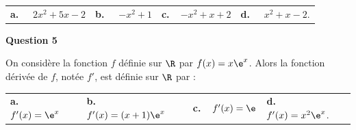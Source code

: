 \begin{tabularx}{\linewidth}{*{4}{X}}
\textbf{a.~~} $2x^2+5x-2 $ &\textbf{b.~~} $-x^2+1 $&\textbf{c.~~}$-x^2+x+2 $& \textbf{d.~~} $x^2+x-2  $.
\end{tabularx}

\medskip

\textbf{Question 5}

\medskip 

On considère la fonction $f$ définie sur $\R$ par $f(x)= x\e^x$.
Alors la fonction dérivée de $f$, notée $f'$, est définie sur $\R$ par :

\medskip

\begin{tabularx}{\linewidth}{*{4}{X}}
\textbf{a.~~} $ f'(x)= \e^x$ &\textbf{b.~~} $f'(x)=(x+1)\e^x$&\textbf{c.~~}$f'(x)=\e $& \textbf{d.~~} $f'(x)=   x^2\e^x   $.
\end{tabularx}

\vspace{0,5cm}
